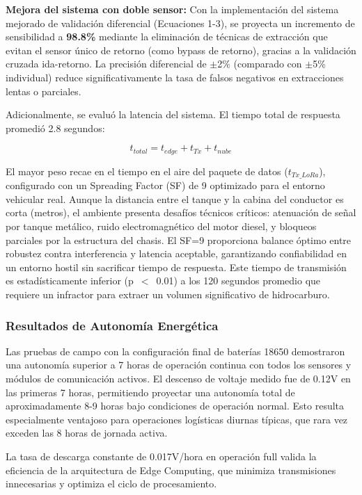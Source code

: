 \documentclass[twocolumn, 10pt]{article}
\begin{document}
\textbf{Mejora del sistema con doble sensor:} Con la implementación del sistema mejorado de validación diferencial (Ecuaciones 1-3), se proyecta un incremento de sensibilidad a \textbf{98.8\%} mediante la eliminación de técnicas de extracción que evitan el sensor único de retorno (como bypass de retorno), gracias a la validación cruzada ida-retorno. La precisión diferencial de $\pm$2\% (comparado con $\pm$5\% individual) reduce significativamente la tasa de falsos negativos en extracciones lentas o parciales.

Adicionalmente, se evaluó la latencia del sistema. El tiempo total de respuesta promedió 2.8 segundos:

{\small
\begin{equation*}
  t_{total} = t_{edge} + t_{Tx} + t_{nube}
\end{equation*}
}

El mayor peso recae en el tiempo en el aire del paquete de datos ($t_{Tx\_LoRa}$), configurado con un Spreading Factor (SF) de 9 optimizado para el entorno vehicular real. Aunque la distancia entre el tanque y la cabina del conductor es corta (metros), el ambiente presenta desafíos técnicos críticos: atenuación de señal por tanque metálico, ruido electromagnético del motor diesel, y bloqueos parciales por la estructura del chasis. El SF=9 proporciona balance óptimo entre robustez contra interferencia y latencia aceptable, garantizando confiabilidad en un entorno hostil sin sacrificar tiempo de respuesta. Este tiempo de transmisión es estadísticamente inferior (p~$<$~0.01) a los 120 segundos promedio que requiere un infractor para extraer un volumen significativo de hidrocarburo. 

\subsubsection*{Resultados de Autonomía Energética}

Las pruebas de campo con la configuración final de baterías 18650 demostraron una autonomía superior a 7 horas de operación continua con todos los sensores y módulos de comunicación activos. El descenso de voltaje medido fue de 0.12V en las primeras 7 horas, permitiendo proyectar una autonomía total de aproximadamente 8-9 horas bajo condiciones de operación normal. Esto resulta especialmente ventajoso para operaciones logísticas diurnas típicas, que rara vez exceden las 8 horas de jornada activa.

La tasa de descarga constante de 0.017V/hora en operación full valida la eficiencia de la arquitectura de Edge Computing, que minimiza transmisiones innecesarias y optimiza el ciclo de procesamiento.
\end{document}
